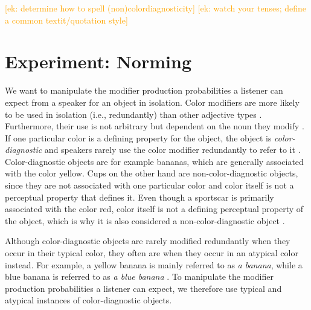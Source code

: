 \documentclass[a4paper,man,floatsintext,natbib,donotrepeattitle]{apa6}
\newcommand{\ek}[1]{\textcolor{Orange}{[ek: #1]}}
\begin{document}





\clearpage

\setcounter{page}{2}
\tableofcontents

\setcounter{secnumdepth}{3}

\clearpage

\ek{determine how to spell (non)colordiagnosticity}
\ek{watch your tenses; define a common textit/quotation style}

\setcounter{page}{1}


\section{Experiment: Norming} \label{experiment}

We want to manipulate the modifier production probabilities a listener can expect from a speaker for an object in isolation. Color modifiers are more likely to be used in isolation (i.e., redundantly) than other adjective types \cite{Pechmann:1982}. Furthermore, their use is not arbitrary but dependent on the noun they modify \cite{Tanaka:1999,Sedivy:2003}. If one particular color is a defining property for the object, the object is \textit{color-diagnostic} and speakers rarely use the color modifier redundantly to refer to it \cite{Tanaka:1999}. Color-diagnostic objects are for example bananas, which are generally associated with the color yellow. Cups on the other hand are non-color-diagnostic objects, since they are not associated with one particular color and color itself is not a perceptual property that defines it. Even though a sportscar is primarily associated with the color red, color itself is not a defining perceptual property of the object, which is why it is also considered a non-color-diagnostic object \cite{Tanaka:1999}. 

Although color-diagnostic objects are rarely modified redundantly when they occur in their typical color, they often are when they occur in an atypical color instead. For example, a yellow banana is mainly referred to as \textit{a banana}, while a blue banana is referred to as \textit{a blue banana} \cite{Westerbeek:2015}. To manipulate the modifier production probabilities a listener can expect, we therefore use typical and atypical instances of color-diagnostic objects.
\end{document}
